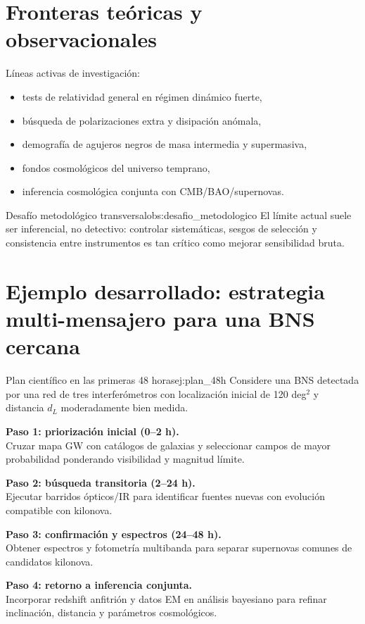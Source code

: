 \section{Fronteras teóricas y observacionales}
\label{sec:fronteras_teoricas_observacionales}

Líneas activas de investigación:
\begin{itemize}[leftmargin=2em]
  \item tests de relatividad general en régimen dinámico fuerte,
  \item búsqueda de polarizaciones extra y disipación anómala,
  \item demografía de agujeros negros de masa intermedia y supermasiva,
  \item fondos cosmológicos del universo temprano,
  \item inferencia cosmológica conjunta con CMB/BAO/supernovas.
\end{itemize}

\begin{observacion}{Desafío metodológico transversal}{obs:desafio_metodologico}
El límite actual suele ser inferencial, no detectivo: controlar sistemáticas, sesgos de selección y consistencia entre instrumentos es tan crítico como mejorar sensibilidad bruta.
\end{observacion}

\section{Ejemplo desarrollado: estrategia multi-mensajero para una BNS cercana}
\label{sec:ejemplo_estrategia_multimensajero}

\begin{ejemplo}{Plan científico en las primeras 48 horas}{ej:plan_48h}
Considere una BNS detectada por una red de tres interferómetros con localización inicial de 120 deg$^2$ y distancia $d_L$ moderadamente bien medida.

\textbf{Paso 1: priorización inicial (0--2 h).} \\
Cruzar mapa GW con catálogos de galaxias y seleccionar campos de mayor probabilidad ponderando visibilidad y magnitud límite.

\textbf{Paso 2: búsqueda transitoria (2--24 h).} \\
Ejecutar barridos ópticos/IR para identificar fuentes nuevas con evolución compatible con kilonova.

\textbf{Paso 3: confirmación y espectros (24--48 h).} \\
Obtener espectros y fotometría multibanda para separar supernovas comunes de candidatos kilonova.

\textbf{Paso 4: retorno a inferencia conjunta.} \\
Incorporar redshift anfitrión y datos EM en análisis bayesiano para refinar inclinación, distancia y parámetros cosmológicos.
\end{ejemplo}

